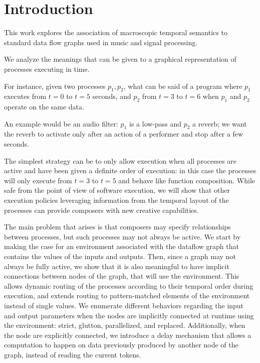 \documentclass{article}
\title{\papertitle}
\begin{document}
    
\capstartfalse
\maketitle
\capstarttrue
\begin{abstract}
\end{abstract}
    
\section{Introduction}
This work explores the association of macroscopic temporal semantics to standard data flow graphs used in music and signal processing.
    
We analyze the meanings that can be given to a graphical representation of processes executing in time. 
    
For instance, given two processes $p_1, p_2$, what can be said of a program where $p_1$ executes from $t=0$ to $t=5$ seconds, and $p_2$ from $t=3$ to $t=6$ when $p_1$ and $p_2$ operate on the same data.
    
An example would be an audio filter: $p_1$ is a low-pass and $p_2$ a reverb; we want the reverb to activate only after an action of a performer and stop after a few seconds.
    
The simplest strategy can be to only allow execution when all processes are active and have been given a definite order of execution: in this case the processes will only execute from $t=3$ to $t=5$ and behave like function composition. 
While safe from the point of view of software execution, we will show that other execution policies leveraging information from the temporal layout of the processes can provide composers with new creative capabilities.
    
The main problem that arises is that composers may specify relationships between processes, but such processes may not always be active. 
We start by making the case for an environment associated with the dataflow graph that contains the values of the inputs and outputs.
Then, since a graph may not always be fully active, we show that it is also meaningful to have implicit connections between nodes of the graph, that will use the environment.
This allows dynamic routing of the processes according to their temporal order during execution, and extends routing to pattern-matched elements of the environment instead of single values.
We enumerate different behaviors regarding the input and output parameters when the nodes are implicitly connected at runtime using the environment: strict, glutton, parallelized, and replaced. 
Additionally, when the node are explicitly connected, we introduce a delay mechanism that allows a computation to happen on data previously produced by another node of the graph, instead of reading the current tokens.
    
\end{document}
